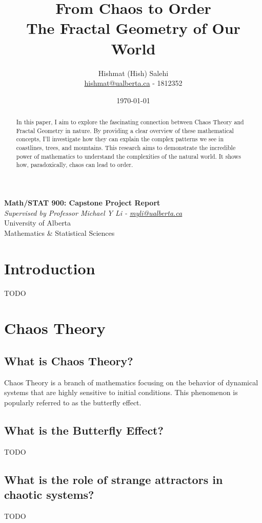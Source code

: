 \documentclass[12pt]{article}
\title{From Chaos to Order\\
       \large The Fractal Geometry of Our World}
\author{Hishmat (Hish) Salehi \\
\href{mailto:hishmat@ualberta.ca}{hishmat@ualberta.ca}  - 1812352}
\date{\today}
\begin{document}
\maketitle

\begin{center}
\textbf{Math/STAT 900: Capstone Project Report}  \\
\emph{Supervised by Professor Michael Y Li - 
\href{mailto:myli@ualberta.ca}{myli@ualberta.ca}}  \\
University of Alberta \\
Mathematics \& Statistical Sciences
\end{center}

\begin{abstract}
In this paper, I aim to explore the fascinating connection between Chaos Theory and Fractal Geometry in nature. By providing a clear overview of these mathematical concepts, I'll investigate how they can explain the complex patterns we see in coastlines, trees, and mountains. This research aims to demonstrate the incredible power of mathematics to understand the complexities of the natural world. It shows how, paradoxically, chaos can lead to order.
\end{abstract}

\newpage

\tableofcontents

\section{Introduction}
TODO

\section{Chaos Theory}
\subsection{What is Chaos Theory?}
Chaos Theory is a branch of mathematics focusing on the behavior of dynamical systems that are highly sensitive to initial conditions. This phenomenon is popularly referred to as the butterfly effect.

\subsection{What is the Butterfly Effect?}
TODO

\subsection{What is the role of strange attractors in chaotic systems?}
TODO
\end{document}
